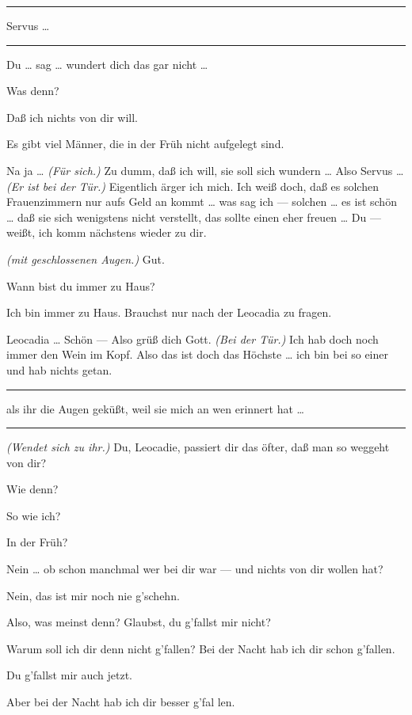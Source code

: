 \documentclass[
	final,
	a4paper,
	ngerman,
	mpinclude = true, %
	twoside = true,
	open = right,
	cleardoublepage = plain,
	DIV = 13,
	BCOR = 1cm,
	titlepage = firstiscover,
	]{scrbook}
\newcommand{\direction}[1]{\textit{(#1)}}
\newenvironment{deletion}{%
		\vspace{0.25\baselineskip}
		\hrule
		\vspace{0.25\baselineskip}
		\color{darkgray}
	}{
		\color{black}
		\vspace{0.25\baselineskip}
		\hrule 
		\vspace{0.25\baselineskip}
	}
\newcommand{\thecharacter}[1]{\textup{\textsc{#1}}\xspace}
\newcommand{\thenutte}{\thecharacter{Leocadia}}
\newcommand{\theentrepeneurin}{\thecharacter{Katerina Albrecht}}
\newcommand{\character}[1]{\item[#1:]}
\newcommand{\nutte}{\character{\thenutte}}
\newcommand{\entrepeneurin}{\character{\theentrepeneurin}}
\begin{document}
\begin{play}
\begin{deletion}
	\nutte
	Servus \ldots{}
	\end{deletion}

	\entrepeneurin
	Du \ldots{} sag \ldots{} wundert dich das gar nicht \ldots{}

	\nutte
	Was denn?

	\entrepeneurin
	Daß ich nichts von dir will.

	\nutte
	Es gibt viel Männer, die in der Früh nicht aufgelegt sind.

	\entrepeneurin
	Na ja \ldots{} \direction{Für sich.} Zu dumm, daß ich will, sie soll sich wundern \ldots{} Also Servus \ldots{} \direction{Er ist bei der Tür.} Eigentlich ärger ich mich. Ich weiß doch, daß es solchen Frauenzimmern nur aufs Geld an kommt \ldots{} was sag ich --- solchen \ldots{} es ist schön \ldots{} daß sie sich wenigstens nicht verstellt, das sollte einen eher freuen \ldots{} Du --- weißt, ich komm nächstens wieder zu dir.

	\nutte
	\direction{mit geschlossenen Augen.} Gut.

	\entrepeneurin
	Wann bist du immer zu Haus?

	\nutte
	Ich bin immer zu Haus. Brauchst nur nach der Leocadia zu fragen.

	\entrepeneurin
	Leocadia \ldots{} Schön --- Also grüß dich Gott. \direction{Bei der Tür.} Ich hab doch noch immer den Wein im Kopf. Also das ist doch das Höchste \ldots{} ich bin bei so einer und hab nichts getan.
	\begin{deletion}
		als ihr die Augen geküßt, weil sie mich an wen erinnert hat \ldots{}
	\end{deletion}
	\direction{Wendet sich zu ihr.} Du, Leocadie, passiert dir das öfter, daß man so weggeht von dir?

	\nutte
	Wie denn?

	\entrepeneurin
	So wie ich?

	\nutte
	In der Früh?

	\entrepeneurin
	Nein \ldots{} ob schon manchmal wer bei dir war --- und nichts von dir wollen hat?

	\nutte
	Nein, das ist mir noch nie g'schehn.

	\entrepeneurin
	Also, was meinst denn? Glaubst, du g'fallst mir nicht?

	\nutte
	Warum soll ich dir denn nicht g'fallen? Bei der Nacht hab ich dir schon g'fallen.

	\entrepeneurin
	Du g'fallst mir auch jetzt.

	\nutte
	Aber bei der Nacht hab ich dir besser g'fal len.


\end{play}
\end{document}
